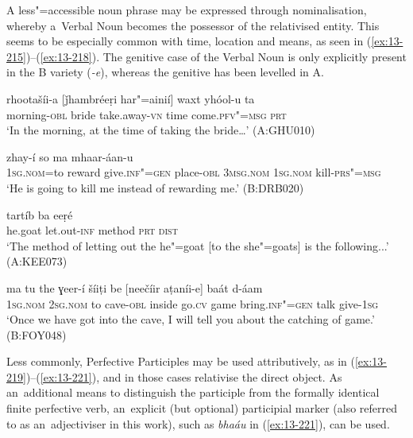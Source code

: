 A less"=accessible noun phrase may be expressed through nominalisation, whereby a~Verbal Noun becomes the possessor of the relativised entity. This seems to be especially common with time, location and means, as seen in (\ref{ex:13-215})--(\ref{ex:13-218}). The genitive case of the Verbal Noun is only explicitly present in the B variety (\textit{-e}), whereas the genitive has been levelled in A.

\begin{exe}
\ex
\label{ex:13-215}
\gll rhootašíi-a [ǰhambréeṛi har"=ainií] waxt  yhóol-u ta \\
morning-\textsc{obl} bride take.away-\textsc{vn} time come.\textsc{pfv"=msg} \textsc{prt} \\
\glt `In the morning, at the time of taking the bride{\ldots}' (A:GHU010)

\ex
\label{ex:13-216}
\gll [máa=the bašéš deníi-e] zhay-í so  ma mhaar-áan-u \\
\textsc{1sg.nom}=to reward give.\textsc{inf"=gen} place-\textsc{obl} \textsc{3msg.nom} \textsc{1sg.nom} kill-\textsc{prs"=msg} \\
\glt `He is going to kill me instead of rewarding me.' (B:DRB020)

\ex
\label{ex:13-217}
 tartíb ba eeṛé  \\
he.goat let.out-\textsc{inf} method \textsc{prt} \textsc{dist} \\
\glt `The method of letting out the he"=goat [to the she"=goats] is the following...' (A:KEE073)

\ex
\label{ex:13-218}
\gll ma tu the ɣeer-í šíiṭi be [neečíir  aṭaníi-e] baát d-áam \\
\textsc{1sg.nom} \textsc{2sg.nom} to cave-\textsc{obl} inside go.\textsc{cv} game  bring.\textsc{inf"=gen} talk give-\textsc{1sg} \\
\glt `Once we have got into the cave, I will tell you about the catching of game.' (B:FOY048) 
\end{exe}

Less commonly, Perfective Participles may be used attributively, as in (\ref{ex:13-219})--(\ref{ex:13-221}), and in those cases relativise the direct object. As an~additional means to distinguish the participle from the formally identical finite perfective verb, an~explicit (but optional) participial marker (also referred to as an~adjectiviser in this work), such as \textit{bhaáu} in (\ref{ex:13-221}), can be used.

